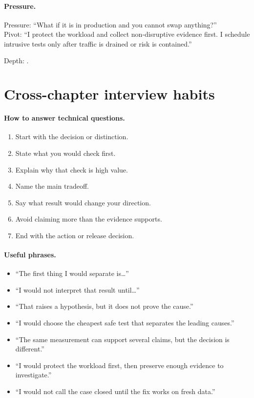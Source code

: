 \paragraph{Pressure.}
Pressure: ``What if it is in production and you cannot swap anything?''\\
Pivot: ``I protect the workload and collect non-disruptive evidence first. I
schedule intrusive tests only after traffic is drained or risk is contained.''

\footnotesize Depth: .

\clearpage
\section{Cross-chapter interview habits}
\label{sec:cheat-habits}

\paragraph{How to answer technical questions.}
\begin{enumerate}
\item Start with the decision or distinction.
\item State what you would check first.
\item Explain why that check is high value.
\item Name the main tradeoff.
\item Say what result would change your direction.
\item Avoid claiming more than the evidence supports.
\item End with the action or release decision.
\end{enumerate}

\paragraph{Useful phrases.}
\begin{itemize}
\item ``The first thing I would separate is\ldots''
\item ``I would not interpret that result until\ldots''
\item ``That raises a hypothesis, but it does not prove the cause.''
\item ``I would choose the cheapest safe test that separates the leading
      causes.''
\item ``The same measurement can support several claims, but the decision is
      different.''
\item ``I would protect the workload first, then preserve enough evidence to
      investigate.''
\item ``I would not call the case closed until the fix works on fresh data.''
\end{itemize}

